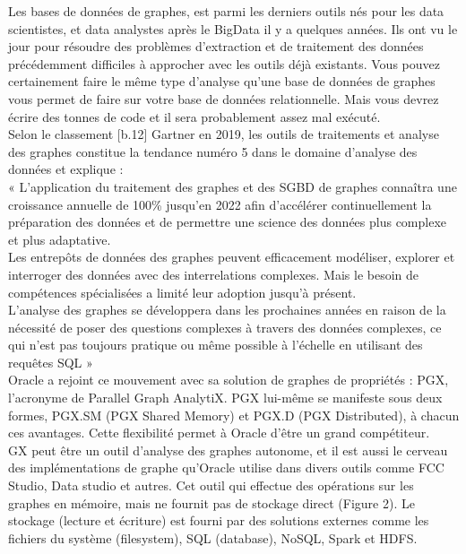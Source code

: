 Les bases de données de graphes, est parmi les derniers outils nés pour les data scientistes, et data analystes après le BigData il y a quelques années. Ils ont vu le jour pour résoudre des problèmes d’extraction et de traitement des données précédemment difficiles à approcher avec les outils déjà existants. Vous pouvez certainement faire le même type d'analyse qu'une base de données de graphes vous permet de faire sur votre base de données relationnelle. Mais vous devrez écrire des tonnes de code et il sera probablement assez mal exécuté.\\
Selon le classement [b.12] Gartner en 2019, les outils de traitements et analyse des graphes constitue la tendance numéro 5 dans le domaine d’analyse des données et explique : \\
« L'application du traitement des graphes et des SGBD de graphes connaîtra une croissance annuelle de 100\% jusqu'en 2022 afin d'accélérer continuellement la préparation des données et de permettre une science des données plus complexe et plus adaptative. \\
Les entrepôts de données des graphes peuvent efficacement modéliser, explorer et interroger des données avec des interrelations complexes. Mais le besoin de compétences spécialisées a limité leur adoption jusqu'à présent.\\
L'analyse des graphes se développera dans les prochaines années en raison de la nécessité de poser des questions complexes à travers des données complexes, ce qui n'est pas toujours pratique ou même possible à l'échelle en utilisant des requêtes SQL »\\
Oracle a rejoint ce mouvement avec sa solution de graphes de propriétés : PGX, l'acronyme de Parallel Graph AnalytiX. PGX lui-même se manifeste sous deux formes, PGX.SM (PGX Shared Memory) et PGX.D (PGX Distributed), à chacun ces avantages. Cette flexibilité permet à Oracle d’être un grand compétiteur.\\
GX peut être un outil d’analyse des graphes autonome, et il est aussi le cerveau des implémentations de graphe qu'Oracle utilise dans divers outils comme FCC Studio, Data studio et autres. Cet outil qui effectue des opérations sur les graphes en mémoire, mais ne fournit pas de stockage direct (Figure 2). Le stockage (lecture et écriture) est fourni par des solutions externes comme les fichiers du système (filesystem), SQL (database), NoSQL, Spark et HDFS.\\

